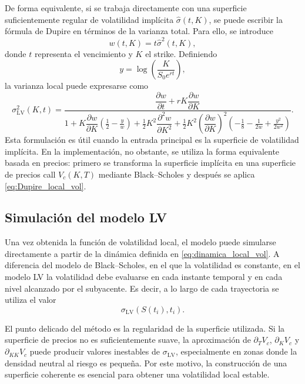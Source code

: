 De forma equivalente, si se trabaja directamente con una superficie suficientemente regular de volatilidad implícita \(\widehat{\sigma}(t,K)\), se puede escribir la fórmula de Dupire en términos de la varianza total. Para ello, se introduce
\[
w(t,K)=t\widehat{\sigma}^2(t,K),
\]
donde \(t\) representa el vencimiento y \(K\) el strike. Definiendo
\[
y=\log\left(\frac{K}{S_0e^{rt}}\right),
\]
la varianza local puede expresarse como
\begin{equation}
\label{eq:varianza_local_implicita}
\sigma_{\mathrm{LV}}^2(K,t)=
\frac{
\dfrac{\partial w}{\partial t}
+
rK\dfrac{\partial w}{\partial K}
}{
1
+
K\dfrac{\partial w}{\partial K}
\left(\frac{1}{2}-\frac{y}{w}\right)
+
\frac{1}{2}K^2\dfrac{\partial^2 w}{\partial K^2}
+
\frac{1}{2}K^2\left(\dfrac{\partial w}{\partial K}\right)^2
\left(
-\frac{1}{8}
-\frac{1}{2w}
+
\frac{y^2}{2w^2}
\right)
}.
\end{equation}
Esta formulación es útil cuando la entrada principal es la superficie de volatilidad implícita. En la implementación, no obstante, se utiliza la forma equivalente basada en precios: primero se transforma la superficie implícita en una superficie de precios call \(V_c(K,T)\) mediante Black--Scholes y después se aplica \ref{eq:Dupire_local_vol}.\medskip

\subsection{Simulación del modelo LV}

Una vez obtenida la función de volatilidad local, el modelo puede simularse directamente a partir de la dinámica definida en \ref{eq:dinamica_local_vol}. A diferencia del modelo de Black--Scholes, en el que la volatilidad es constante, en el modelo LV la volatilidad debe evaluarse en cada instante temporal y en cada nivel alcanzado por el subyacente. Es decir, a lo largo de cada trayectoria se utiliza el valor
\[
\sigma_{\mathrm{LV}}(S(t_i),t_i).
\]

El punto delicado del método es la regularidad de la superficie utilizada. Si la superficie de precios no es suficientemente suave, la aproximación de \(\partial_T V_c\), \(\partial_K V_c\) y \(\partial_{KK}V_c\) puede producir valores inestables de \(\sigma_{\mathrm{LV}}\), especialmente en zonas donde la densidad neutral al riesgo es pequeña. Por este motivo, la construcción de una superficie coherente es esencial para obtener una volatilidad local estable.

